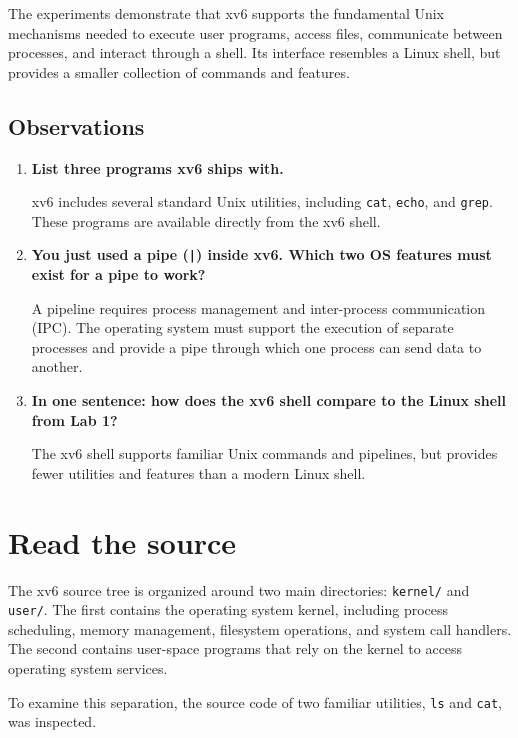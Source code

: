 \documentclass{tum_report}
\begin{document}
The experiments demonstrate that xv6 supports the fundamental
Unix mechanisms needed to execute user programs, access files,
communicate between processes, and interact through a shell.
Its interface resembles a Linux shell, but provides a smaller
collection of commands and features.


\subsection{Observations}

\begin{enumerate}
    \item \textbf{List three programs xv6 ships with.}

    xv6 includes several standard Unix utilities, including
    \texttt{cat}, \texttt{echo}, and \texttt{grep}.
    These programs are available directly from the xv6 shell.

    \item \textbf{You just used a pipe (\texttt{|}) inside xv6.
    Which two OS features must exist for a pipe to work?}

    A pipeline requires process management and inter-process
    communication (IPC). The operating system must support
    the execution of separate processes and provide a pipe
    through which one process can send data to another.

    \item \textbf{In one sentence: how does the xv6 shell compare
    to the Linux shell from Lab 1?}

    The xv6 shell supports familiar Unix commands and pipelines,
    but provides fewer utilities and features than a modern
    Linux shell.
\end{enumerate}

\section{Read the source}

The xv6 source tree is organized around two main directories:
\texttt{kernel/} and \texttt{user/}. The first contains the operating
system kernel, including process scheduling, memory management,
filesystem operations, and system call handlers. The second contains
user-space programs that rely on the kernel to access operating
system services.

To examine this separation, the source code of two familiar
utilities, \texttt{ls} and \texttt{cat}, was inspected.
\end{document}
